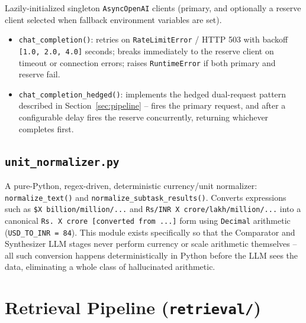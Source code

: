 \documentclass[11pt,a4paper]{report}
\newcommand{\code}[1]{\texttt{#1}}
\newcommand{\file}[1]{\texttt{\small #1}}
\begin{document}
Lazily-initialized singleton \code{AsyncOpenAI} clients (primary, and optionally a
reserve client selected when fallback environment variables are set).

\begin{itemize}
    \item \code{chat\_completion()}: retries on \code{RateLimitError} / HTTP 503 with
    backoff \code{[1.0, 2.0, 4.0]} seconds; breaks immediately to the reserve client on
    timeout or connection errors; raises \code{RuntimeError} if both primary and
    reserve fail.
    \item \code{chat\_completion\_hedged()}: implements the hedged dual-request pattern
    described in Section~\ref{sec:pipeline} -- fires the primary request, and after a
    configurable delay fires the reserve concurrently, returning whichever completes
    first.
\end{itemize}

\subsection{\file{unit\_normalizer.py}}
\label{sec:unit-normalizer}

A pure-Python, regex-driven, deterministic currency/unit normalizer:
\code{normalize\_text()} and \code{normalize\_subtask\_results()}. Converts expressions
such as \code{\$X billion/million/...} and \code{Rs/INR X
crore/lakh/million/...} into a canonical \code{Rs. X crore [converted from
...]} form using \code{Decimal} arithmetic (\code{USD\_TO\_INR = 84}). This module
exists specifically so that the Comparator and Synthesizer LLM stages never perform
currency or scale arithmetic themselves -- all such conversion happens deterministically
in Python before the LLM sees the data, eliminating a whole class of hallucinated
arithmetic.

\section{Retrieval Pipeline (\file{retrieval/})}
\end{document}
